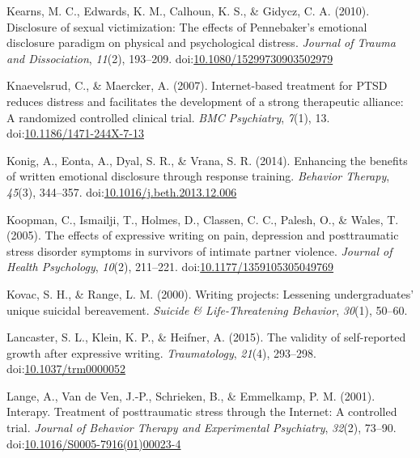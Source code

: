 \documentclass[man]{apa6}
\theoremstyle{definition}
\theoremstyle{definition}
\theoremstyle{definition}
\theoremstyle{remark}
\begin{document}
\leavevmode\hypertarget{ref-Kearns2010}{}%
Kearns, M. C., Edwards, K. M., Calhoun, K. S., \& Gidycz, C. A. (2010).
Disclosure of sexual victimization: The effects of Pennebaker's
emotional disclosure paradigm on physical and psychological distress.
\emph{Journal of Trauma and Dissociation}, \emph{11}(2), 193--209.
doi:\href{https://doi.org/10.1080/15299730903502979}{10.1080/15299730903502979}

\leavevmode\hypertarget{ref-Knaevelsrud2007}{}%
Knaevelsrud, C., \& Maercker, A. (2007). Internet-based treatment for
PTSD reduces distress and facilitates the development of a strong
therapeutic alliance: A randomized controlled clinical trial. \emph{BMC
Psychiatry}, \emph{7}(1), 13.
doi:\href{https://doi.org/10.1186/1471-244X-7-13}{10.1186/1471-244X-7-13}

\leavevmode\hypertarget{ref-Konig2014}{}%
Konig, A., Eonta, A., Dyal, S. R., \& Vrana, S. R. (2014). Enhancing the
benefits of written emotional disclosure through response training.
\emph{Behavior Therapy}, \emph{45}(3), 344--357.
doi:\href{https://doi.org/10.1016/j.beth.2013.12.006}{10.1016/j.beth.2013.12.006}

\leavevmode\hypertarget{ref-Koopman2005}{}%
Koopman, C., Ismailji, T., Holmes, D., Classen, C. C., Palesh, O., \&
Wales, T. (2005). The effects of expressive writing on pain, depression
and posttraumatic stress disorder symptoms in survivors of intimate
partner violence. \emph{Journal of Health Psychology}, \emph{10}(2),
211--221.
doi:\href{https://doi.org/10.1177/1359105305049769}{10.1177/1359105305049769}

\leavevmode\hypertarget{ref-Kovac2000}{}%
Kovac, S. H., \& Range, L. M. (2000). Writing projects: Lessening
undergraduates' unique suicidal bereavement. \emph{Suicide \&
Life-Threatening Behavior}, \emph{30}(1), 50--60.

\leavevmode\hypertarget{ref-Lancaster2015}{}%
Lancaster, S. L., Klein, K. P., \& Heifner, A. (2015). The validity of
self-reported growth after expressive writing. \emph{Traumatology},
\emph{21}(4), 293--298.
doi:\href{https://doi.org/10.1037/trm0000052}{10.1037/trm0000052}

\leavevmode\hypertarget{ref-Lange2001}{}%
Lange, A., Van de Ven, J.-P., Schrieken, B., \& Emmelkamp, P. M. (2001).
Interapy. Treatment of posttraumatic stress through the Internet: A
controlled trial. \emph{Journal of Behavior Therapy and Experimental
Psychiatry}, \emph{32}(2), 73--90.
doi:\href{https://doi.org/10.1016/S0005-7916(01)00023-4}{10.1016/S0005-7916(01)00023-4}
\end{document}
